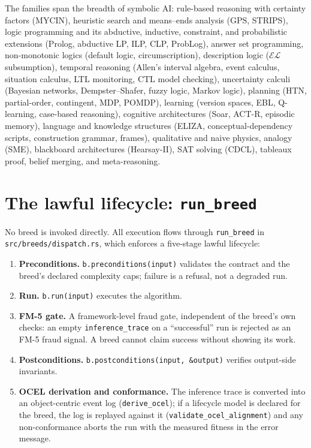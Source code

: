 \documentclass[11pt,oneside]{report}
\begin{document}
The families span the breadth of symbolic AI: rule-based reasoning with
certainty factors (MYCIN), heuristic search and means--ends analysis (GPS,
STRIPS), logic programming and its abductive, inductive, constraint, and
probabilistic extensions (Prolog, abductive LP, ILP, CLP, ProbLog), answer
set programming, non-monotonic logics (default logic, circumscription),
description logic ($\mathcal{EL}$ subsumption), temporal reasoning (Allen's
interval algebra, event calculus, situation calculus, LTL monitoring, CTL
model checking), uncertainty calculi (Bayesian networks, Dempster--Shafer,
fuzzy logic, Markov logic), planning (HTN, partial-order, contingent, MDP,
POMDP), learning (version spaces, EBL, Q-learning, case-based reasoning),
cognitive architectures (Soar, ACT-R, episodic memory), language and
knowledge structures (ELIZA, conceptual-dependency scripts, construction
grammar, frames), qualitative and naive physics, analogy (SME), blackboard
architectures (Hearsay-II), SAT solving (CDCL), tableaux proof, belief
merging, and meta-reasoning.

\section{The lawful lifecycle: \texttt{run\_breed}}
\label{sec:lifecycle}

No breed is invoked directly. All execution flows through
\texttt{run\_breed} in \texttt{src/breeds/dispatch.rs}, which enforces a
five-stage lawful lifecycle:

\begin{enumerate}
  \item \textbf{Preconditions.} \texttt{b.preconditions(input)} validates
  the contract and the breed's declared complexity caps; failure is a
  refusal, not a degraded run.
  \item \textbf{Run.} \texttt{b.run(input)} executes the algorithm.
  \item \textbf{FM-5 gate.} A framework-level fraud gate, independent of
  the breed's own checks: an empty \texttt{inference\_trace} on a
  ``successful'' run is rejected as an FM-5 fraud signal. A breed cannot
  claim success without showing its work.
  \item \textbf{Postconditions.} \texttt{b.postconditions(input, \&output)}
  verifies output-side invariants.
  \item \textbf{OCEL derivation and conformance.} The inference trace is
  converted into an object-centric event log
  (\texttt{derive\_ocel}); if a lifecycle model is declared for the
  breed, the log is replayed against it
  (\texttt{validate\_ocel\_alignment}) and any non-conformance aborts
  the run with the measured fitness in the error message.
\end{enumerate}
\end{document}
